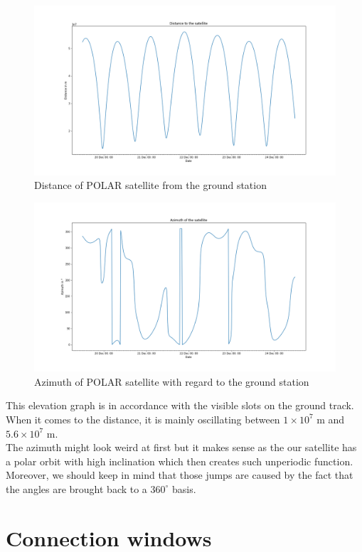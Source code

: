 \documentclass[a4paper,12pt,calibri,oneside,openany]{book}
\theoremstyle{break}
\begin{document}
\begin{figure}[H]
	\centering
	\includegraphics[width=\linewidth]{distance}
	\caption{Distance of POLAR satellite from the ground station}
\end{figure}

\begin{figure}[H]
	\centering
	\includegraphics[width=\linewidth]{azimuth}
	\caption{Azimuth of POLAR satellite with regard to the ground station}
\end{figure}

This elevation graph is in accordance with the visible slots on the ground track. When it comes to the distance, it is mainly oscillating between $1\times10^7$ m and $5.6\times 10^7$ m.\\

 The azimuth might look weird at first but it makes sense as the our satellite has a polar orbit with high inclination which then creates such unperiodic function. Moreover, we should keep in mind that those jumps are caused by the fact that the angles are brought back to a $360^\circ$ basis.
\newpage
\section{Connection windows}
\end{document}
